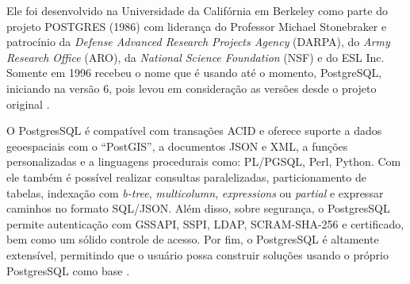 Ele foi desenvolvido na Universidade da Califórnia em Berkeley como parte do projeto POSTGRES (1986) com liderança do Professor Michael Stonebraker e patrocínio da \textit{Defense Advanced Research Projects Agency} (DARPA), do \textit{Army Research Office} (ARO), da \textit{National Science Foundation} (NSF) e do ESL Inc. Somente em 1996 recebeu o nome que é usando até o momento, PostgreSQL, iniciando na versão 6, pois levou em consideração as versões desde o projeto original \cite{postgresHistory}.

O PostgresSQL é compatível com transações ACID e oferece suporte a dados geoespaciais com o \enquote{PostGIS}, a documentos JSON e XML, a funções personalizadas e a linguagens procedurais como: PL/PGSQL, Perl, Python. Com ele também é possível realizar consultas paralelizadas, particionamento de tabelas, indexação com \textit{b-tree}, \textit{multicolumn}, \textit{expressions} ou \textit{partial} e expressar caminhos no formato SQL/JSON. Além disso, sobre segurança, o PostgresSQL permite autenticação com GSSAPI, SSPI, LDAP, SCRAM-SHA-256 e certificado, bem como um sólido controle de acesso. Por fim, o PostgresSQL é altamente extensível, permitindo que o usuário possa construir soluções usando o próprio PostgresSQL como base \cite{postgresAbout}.